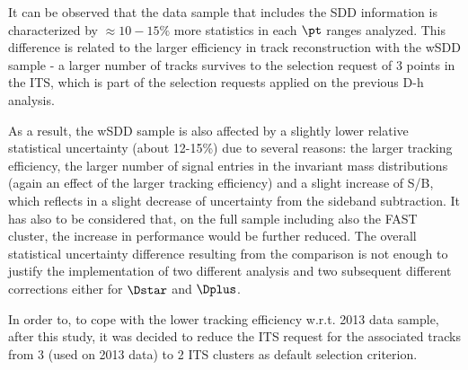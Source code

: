 It can be observed that the data sample that includes the SDD information is characterized by $\approx 10-15\%$ more statistics in each $\pt$ ranges analyzed. This difference is related to the larger efficiency in track reconstruction with the wSDD sample - a larger number of tracks survives to the selection request of 3 points in the ITS, which is part of the selection requests applied on the previous D-h analysis.

As a result, the wSDD sample is also affected by a slightly lower relative statistical uncertainty (about 12-15\%) due to several reasons: the larger tracking efficiency, the larger number of signal entries in the invariant mass distributions (again an effect of the larger tracking efficiency) and a slight increase of S/B, which reflects in a slight decrease of uncertainty from the sideband subtraction.
It has also to be considered that, on the full sample including also the FAST cluster, the increase in performance would be further reduced.
The overall statistical uncertainty difference resulting from the comparison is not enough to justify the implementation of two different analysis and two subsequent different corrections either for $\Dstar$ and $\Dplus$.

In order to, to cope with the lower tracking efficiency w.r.t. 2013 data sample, after this study, it was decided to reduce the ITS request for the associated tracks from 3 (used on 2013 data) to 2 ITS clusters as default selection criterion.


